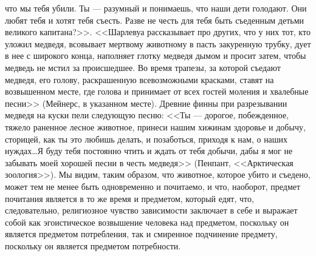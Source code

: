 \documentclass[12pt]{article}
\begin{document}
что мы тебя убили. Ты --- разумный и понимаешь, что наши дети голодают. Они любят тебя и хотят тебя съесть. Разве не честь для тебя быть съеденным детьми великого капитана?>>. <<Шарлевуа рассказывает про других, что у них тот, кто уложил медведя, всовывает мертвому животному в пасть закуренную трубку, дует в нее с широкого конца, наполняет глотку медведя дымом и просит затем, чтобы медведь не мстил за происшедшее. Во время трапезы, за которой съедают медведя, его голову, раскрашенную всевозможными красками, ставят на возвышенном месте, где голова и принимает от всех гостей моления и хвалебные песни>> (Мейнерс, в указанном месте). Древние финны при разрезывании медведя на куски пели следующую песню: <<Ты --- дорогое, побежденное, тяжело раненное лесное животное, принеси нашим хижинам здоровье и добычу, сторицей, как ты это любишь делать, и позаботься, приходя к нам, о наших нуждах\dots Я буду тебя постоянно чтить и ждать от тебя добычи, дабы я мог не забывать моей хорошей песни в честь медведя>> (Пенпант, <<Арктическая зоология>>). Мы видим, таким образом, что животное, которое убито и съедено, может тем не менее быть одновременно и почитаемо, и что, наоборот, предмет почитания является в то же время и предметом, который едят, что, следовательно, религиозное чувство зависимости заключает в себе и выражает собой как эгоистическое возвышение человека над предметом, поскольку он является предметом потребления, так и смиренное подчинение предмету, поскольку он является предметом потребности. 
\end{document}

